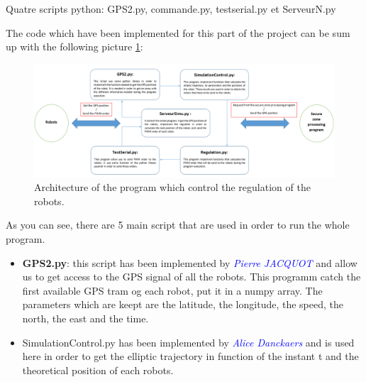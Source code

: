 

Quatre scripts python: GPS2.py, commande.py, testserial.py et ServeurN.py

The code which have been implemented for this part of the project can be sum up with the following picture \ref{fig:SyntheseCodeRegulationRobot}:

\begin{figure}[ht]
\centering
    \includegraphics[scale=0.5,angle=90]{SyntheseCodeRegulationRobot.PNG}
    \caption{Architecture of the program which control the regulation of the robots.}
    \label{fig:SyntheseCodeRegulationRobot}
\end{figure}

As you can see, there are 5 main script that are used in order to run the whole program.

\begin{itemize}
\item \textbf{GPS2.py}: this script has been implemented by \textcolor{blue}{\textit{Pierre JACQUOT}} and allow us to get access to the GPS signal of all the robots. This programm catch the first available GPS tram og each robot, put it in a numpy array. The parameters which are keept are the latitude, the longitude, the speed, the north, the east and the time.
\item SimulationControl.py has been implemented by  \textcolor{blue}{\textit{Alice Danckaers}} and is used here in order to get the elliptic trajectory in function of the instant t and the theoretical position of each robots.

\end{itemize}
\pagebreak